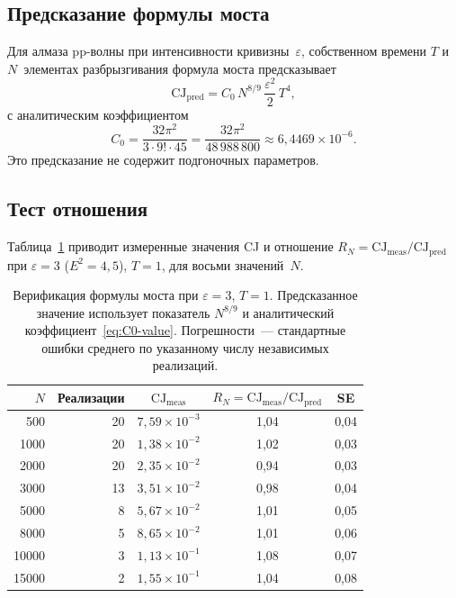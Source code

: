 \documentclass[12pt,a4paper]{article}
\theoremstyle{plain}
\theoremstyle{definition}
\theoremstyle{remark}
\newcommand{\CJ}{\mathrm{CJ}}
\begin{document}
\subsection{Предсказание формулы моста}
\label{sec:prediction}

Для алмаза pp-волны при интенсивности
кривизны~$\varepsilon$, собственном времени $T$ и $N$~элементах
разбрызгивания формула моста предсказывает
\begin{equation}\label{eq:CJ-pred}
  \CJ_{\mathrm{pred}} = C_0\, N^{8/9}\, \frac{\varepsilon^2}{2}\, T^4,
\end{equation}
с аналитическим коэффициентом
\begin{equation}\label{eq:C0-value}
  C_0 = \frac{32\pi^2}{3 \cdot 9! \cdot 45}
  = \frac{32\pi^2}{48\,988\,800}
  \approx 6{,}4469 \times 10^{-6}.
\end{equation}
Это предсказание не содержит подгоночных параметров.

\subsection{Тест отношения}
\label{sec:ratio}

Таблица~\ref{tab:ratio} приводит измеренные значения CJ
и отношение $R_N = \CJ_{\mathrm{meas}} / \CJ_{\mathrm{pred}}$
при $\varepsilon = 3$ ($E^2 = 4{,}5$), $T = 1$, для восьми
значений~$N$.

\begin{table}[ht]
\centering
\caption{Верификация формулы моста при $\varepsilon = 3$,
$T = 1$.  Предсказанное значение использует показатель
$N^{8/9}$ и аналитический
коэффициент~\eqref{eq:C0-value}.  Погрешности~--- стандартные
ошибки среднего по указанному числу независимых реализаций.}
\label{tab:ratio}
\begin{tabular}{rrccc}
\toprule
$N$ & Реализации & $\CJ_{\mathrm{meas}}$
    & $R_N = \CJ_{\mathrm{meas}}/\CJ_{\mathrm{pred}}$ & SE \\
\midrule
  500 & 20 & $7{,}59 \times 10^{-3}$ & 1,04 & 0,04 \\
 1000 & 20 & $1{,}38 \times 10^{-2}$ & 1,02 & 0,03 \\
 2000 & 20 & $2{,}35 \times 10^{-2}$ & 0,94 & 0,03 \\
 3000 & 13 & $3{,}51 \times 10^{-2}$ & 0,98 & 0,04 \\
 5000 &  8 & $5{,}67 \times 10^{-2}$ & 1,01 & 0,05 \\
 8000 &  5 & $8{,}65 \times 10^{-2}$ & 1,01 & 0,06 \\
10000 &  3 & $1{,}13 \times 10^{-1}$ & 1,08 & 0,07 \\
15000 &  2 & $1{,}55 \times 10^{-1}$ & 1,04 & 0,08 \\
\bottomrule
\end{tabular}
\end{table}
\end{document}
